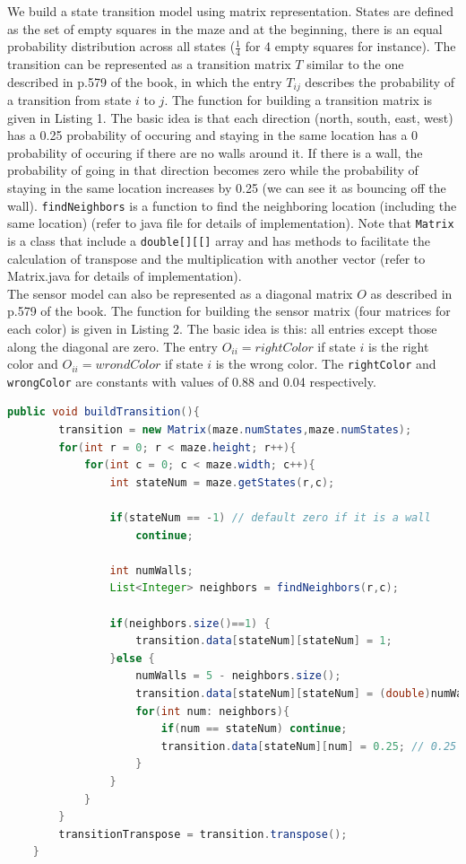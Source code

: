 \documentclass[9.5pt]{extarticle}
\begin{document}
We build a state transition model using matrix representation. States are defined as the set of empty squares in the maze and at the beginning, there is an equal probability distribution across all states ($\frac{1}{4}$ for 4 empty squares for instance). The transition can be represented as a transition matrix $T$ similar to the one described in p.579 of the book, in which the entry $T_{ij}$ describes the probability of a transition from state $i$ to $j$. The function for building a transition matrix is given in Listing 1. The basic idea is that each direction (north, south, east, west) has a 0.25 probability of occuring and staying in the same location has a 0 probability of occuring if there are no walls around it. If there is a wall, the probability of going in that direction becomes zero while the probability of staying in the same location increases by 0.25 (we can see it as bouncing off the wall). \verb`findNeighbors` is a function to find the neighboring location (including the same location) (refer to java file for details of implementation). Note that \verb`Matrix` is a class that include a \verb`double[][[]` array and has methods to facilitate the calculation of transpose and the multiplication with another vector (refer to Matrix.java for details of implementation).\\

The sensor model can also be represented as a diagonal matrix $O$ as described in p.579 of the book. The function for building the sensor matrix (four matrices for each color) is given in Listing 2. The basic idea is this: all entries except those along the diagonal are zero. The entry $O_{ii} = rightColor$ if state $i$ is the right color and $O_{ii} = wrondColor$ if state $i$ is the wrong color. The \verb`rightColor` and  \verb`wrongColor` are constants with values of 0.88 and 0.04 respectively.

\begin{lstlisting}[language=java,caption={buildTransition}]
	public void buildTransition(){
        transition = new Matrix(maze.numStates,maze.numStates);
        for(int r = 0; r < maze.height; r++){
            for(int c = 0; c < maze.width; c++){
                int stateNum = maze.getStates(r,c);
                
                if(stateNum == -1) // default zero if it is a wall
                    continue;
                    
                int numWalls;
                List<Integer> neighbors = findNeighbors(r,c);

                if(neighbors.size()==1) {
                    transition.data[stateNum][stateNum] = 1;
                }else {
                    numWalls = 5 - neighbors.size();
                    transition.data[stateNum][stateNum] = (double)numWalls/4.0;
                    for(int num: neighbors){
                        if(num == stateNum) continue;
                        transition.data[stateNum][num] = 0.25; // 0.25 probability for each direction
                    }
                }
            }
        }
        transitionTranspose = transition.transpose();
    }
\end{lstlisting}
\end{document}
